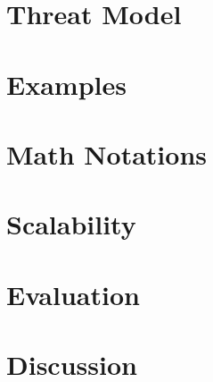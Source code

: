 \section{Threat Model}

\section{Examples}

\section{Math Notations}

\section{Scalability}

\section{Evaluation}

\section{Discussion}

